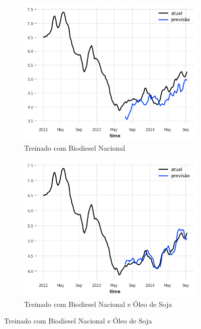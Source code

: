 \begin{figure}[htbp]
	\centering
	\begin{subfigure}[b]{0.45\textwidth}
		\centering
		\includegraphics[width=\textwidth]{figuras/imp_takens_brasil_plot.png} %
		\caption{Treinado com Biodiesel Nacional \newline}
		\label{fig:imp_takens_brasil_plot}
	\end{subfigure}
	\hfill
	\begin{subfigure}[b]{0.45\textwidth}
		\centering
		\includegraphics[width=\textwidth]{figuras/imp_takens_brasil_oil_plot.png} %
		\caption{Treinado com Biodiesel Nacional e Óleo de Soja}
		\label{fig:imp_takens_brasil_oil_plot}
	\end{subfigure}


\end{figure}
